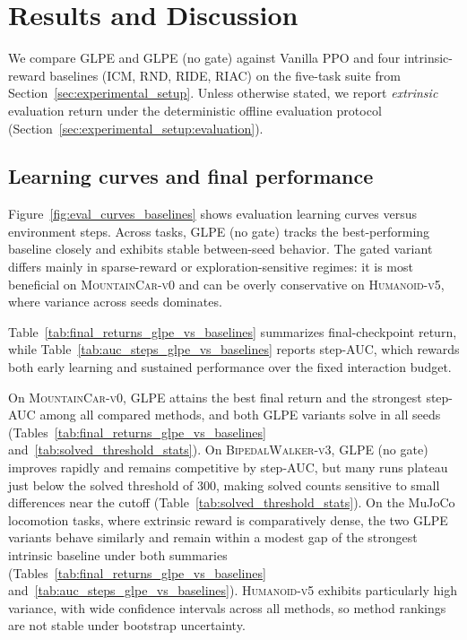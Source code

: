 \section{Results and Discussion}
\label{sec:results}

We compare GLPE and GLPE (no gate) against Vanilla PPO and four intrinsic-reward baselines (ICM, RND, RIDE, RIAC) on the five-task suite from Section~\ref{sec:experimental_setup}.
Unless otherwise stated, we report \emph{extrinsic} evaluation return under the deterministic offline evaluation protocol (Section~\ref{sec:experimental_setup:evaluation}).

\subsection{Learning curves and final performance}

Figure~\ref{fig:eval_curves_baselines} shows evaluation learning curves versus environment steps.
Across tasks, GLPE (no gate) tracks the best-performing baseline closely and exhibits stable between-seed behavior.
The gated variant differs mainly in sparse-reward or exploration-sensitive regimes: it is most beneficial on \textsc{MountainCar-v0} and can be overly conservative on \textsc{Humanoid-v5}, where variance across seeds dominates.

Table~\ref{tab:final_returns_glpe_vs_baselines} summarizes final-checkpoint return, while Table~\ref{tab:auc_steps_glpe_vs_baselines} reports step-AUC, which rewards both early learning and sustained performance over the fixed interaction budget.

On \textsc{MountainCar-v0}, GLPE attains the best final return and the strongest step-AUC among all compared methods, and both GLPE variants solve in all seeds (Tables~\ref{tab:final_returns_glpe_vs_baselines} and~\ref{tab:solved_threshold_stats}).
On \textsc{BipedalWalker-v3}, GLPE (no gate) improves rapidly and remains competitive by step-AUC, but many runs plateau just below the solved threshold of $300$, making solved counts sensitive to small differences near the cutoff (Table~\ref{tab:solved_threshold_stats}).
On the MuJoCo locomotion tasks, where extrinsic reward is comparatively dense, the two GLPE variants behave similarly and remain within a modest gap of the strongest intrinsic baseline under both summaries (Tables~\ref{tab:final_returns_glpe_vs_baselines} and~\ref{tab:auc_steps_glpe_vs_baselines}).
\textsc{Humanoid-v5} exhibits particularly high variance, with wide confidence intervals across all methods, so method rankings are not stable under bootstrap uncertainty.

